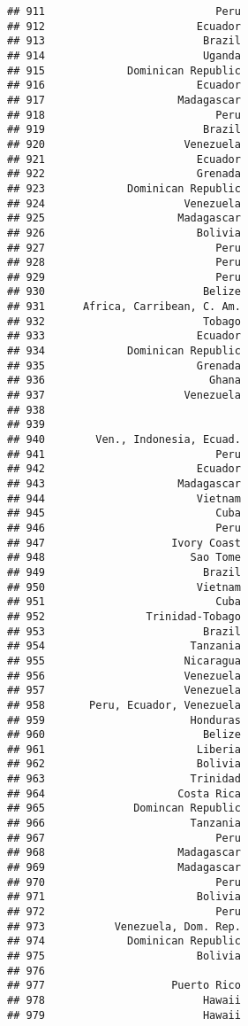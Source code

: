 \documentclass[
]{article}
\begin{document}
\begin{verbatim}
## 911                           Peru
## 912                        Ecuador
## 913                         Brazil
## 914                         Uganda
## 915             Dominican Republic
## 916                        Ecuador
## 917                     Madagascar
## 918                           Peru
## 919                         Brazil
## 920                      Venezuela
## 921                        Ecuador
## 922                        Grenada
## 923             Dominican Republic
## 924                      Venezuela
## 925                     Madagascar
## 926                        Bolivia
## 927                           Peru
## 928                           Peru
## 929                           Peru
## 930                         Belize
## 931      Africa, Carribean, C. Am.
## 932                         Tobago
## 933                        Ecuador
## 934             Dominican Republic
## 935                        Grenada
## 936                          Ghana
## 937                      Venezuela
## 938                               
## 939                               
## 940        Ven., Indonesia, Ecuad.
## 941                           Peru
## 942                        Ecuador
## 943                     Madagascar
## 944                        Vietnam
## 945                           Cuba
## 946                           Peru
## 947                    Ivory Coast
## 948                       Sao Tome
## 949                         Brazil
## 950                        Vietnam
## 951                           Cuba
## 952                Trinidad-Tobago
## 953                         Brazil
## 954                       Tanzania
## 955                      Nicaragua
## 956                      Venezuela
## 957                      Venezuela
## 958       Peru, Ecuador, Venezuela
## 959                       Honduras
## 960                         Belize
## 961                        Liberia
## 962                        Bolivia
## 963                       Trinidad
## 964                     Costa Rica
## 965              Domincan Republic
## 966                       Tanzania
## 967                           Peru
## 968                     Madagascar
## 969                     Madagascar
## 970                           Peru
## 971                        Bolivia
## 972                           Peru
## 973           Venezuela, Dom. Rep.
## 974             Dominican Republic
## 975                        Bolivia
## 976                               
## 977                    Puerto Rico
## 978                         Hawaii
## 979                         Hawaii

\end{verbatim}
\end{document}
